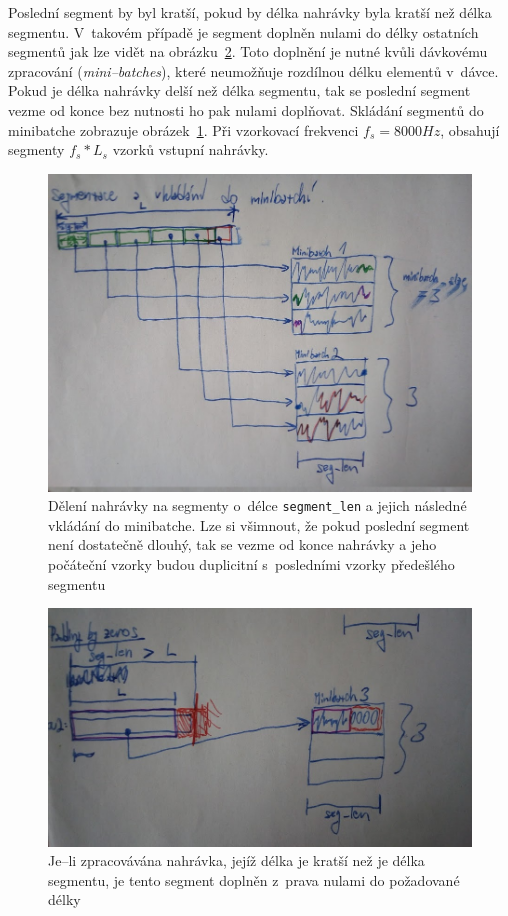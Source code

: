 Poslední segment by byl kratší, pokud by délka nahrávky byla kratší než délka segmentu. V~takovém případě je segment doplněn nulami do délky ostatních segmentů jak lze vidět na obrázku~\ref{fig:segmentace_padding}. Toto doplnění je nutné kvůli dávkovému zpracování (\textit{mini--batches}), které neumožňuje rozdílnou délku elementů v~dávce. Pokud je délka nahrávky delší než délka segmentu, tak se poslední segment vezme od konce bez nutnosti ho pak nulami doplňovat. Skládání segmentů do minibatche zobrazuje obrázek~\ref{fig:minibatch_segmentace}. Při vzorkovací frekvenci $f_s = 8000Hz$, obsahují segmenty $f_s * L_s$ vzorků vstupní nahrávky. 

\begin{figure}[H]
    \centering
    \includegraphics[scale=0.30]{obrazky-figures/minibatch_segmentace.jpg}
    \caption{\label{fig:minibatch_segmentace}Dělení nahrávky na segmenty o~délce \texttt{segment\_len} a jejich následné vkládání do minibatche. Lze si všimnout, že pokud poslední segment není dostatečně dlouhý, tak se vezme od konce nahrávky a jeho počáteční vzorky budou duplicitní s~posledními vzorky předešlého segmentu}
\end{figure}

\begin{figure}[H]
    \centering
    \includegraphics[scale=0.30]{obrazky-figures/minibatch_segmentace_padding.jpg}
    \caption{\label{fig:segmentace_padding}Je--li zpracovávána nahrávka, jejíž délka je kratší než je délka segmentu, je tento segment doplněn z~prava nulami do požadované délky}
\end{figure}

